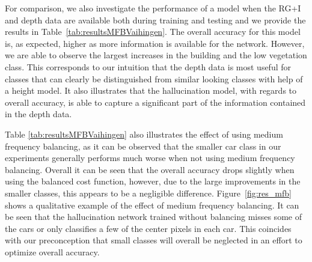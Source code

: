 \documentclass[journal]{IEEEtran}
\begin{document}
For comparison, we also investigate the performance of a model when the RG+I and depth data are available both during training and testing and we provide the results in Table~\ref{tab:resultsMFBVaihingen}. The overall accuracy for this model is, as expected, higher as more information is available for the network. However, we are able to observe the largest increases in the building and the low vegetation class. This corresponds to our intuition that the depth data is most useful for classes that can clearly be distinguished from similar looking classes with help of a height model. It also illustrates that the hallucination model, with regards to overall accuracy, is able to capture a significant part of the information contained in the depth data.

Table \ref{tab:resultsMFBVaihingen} also illustrates the effect of using medium frequency balancing, as it can be observed that the smaller car class in our experiments generally performs much worse when not using medium frequency balancing. Overall it can be seen that the overall accuracy drops slightly when using the balanced cost function, however, due to the large improvements in the smaller classes, this appears to be a negligible difference. Figure~\ref{fig:res_mfb} shows a qualitative example of the effect of medium frequency balancing. It can be seen that the hallucination network trained without balancing misses some of the cars or only classifies a few of the center pixels in each car. This coincides with our preconception that small classes will overall be neglected in an effort to optimize overall accuracy.
\end{document}
